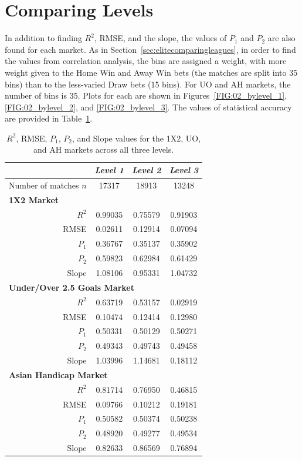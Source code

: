 \documentclass[a4paper,10pt]{report}
\begin{document}
\section{Comparing Levels} \label{sec:enscolevels}
In addition to finding $R^2$, RMSE, and the slope, the values of $P_1$ and $P_2$ are also found for each market. As in Section~\ref{sec:elitecomparingleagues}, in order to find the values from correlation analysis, the bins are assigned a weight, with more weight given to the Home Win and Away Win bets (the matches are split into 35 bins) than to the less-varied Draw bets (15 bins). For UO and AH markets, the number of bins is 35. Plots for each are shown in Figures~\ref{FIG:02_bylevel_1}, \ref{FIG:02_bylevel_2}, and \ref{FIG:02_bylevel_3}. The values of statistical accuracy are provided in Table~\ref{tab:ensco_valuesbylevel}. 

\begin{table}[h!]\begin{center}\begin{tabular}{r||ccc}
		& \textit{Level 1} 	& \textit{Level 2} 	&\textit{Level 3} \\ \hline \hline
Number of matches $n$ 	& 17317	& 18913	& 13248 \\ \hline
\multicolumn{4}{l}{\textbf{1X2 Market}} \\ \hline
$R^2$ 					& 0.99035	& 0.75579	& 0.91903 \\
RMSE					& 0.02611 	& 0.12914 	& 0.07094 \\ 
$P_1$					& 0.36767 	& 0.35137 	& 0.35902 \\ 
$P_2$					& 0.59823 	& 0.62984 	& 0.61429 \\ 
Slope					& 1.08106	& 0.95331	& 1.04732 \\ \hline
\multicolumn{4}{l}{\textbf{Under/Over 2.5 Goals Market}} \\ \hline
$R^2$					& 0.63719	& 0.53157 	& 0.02919 \\
RMSE					& 0.10474	& 0.12414 	& 0.12980 \\ 
$P_1$					& 0.50331 	& 0.50129 	& 0.50271 \\
$P_2$					& 0.49343 	& 0.49743 	& 0.49458 \\
Slope					& 1.03996	& 1.14681	& 0.18112 \\ \hline
\multicolumn{4}{l}{\textbf{Asian Handicap Market}} \\ \hline
$R^2$					& 0.81714	& 0.76950	& 0.46815 \\
RMSE					& 0.09766	& 0.10212 	& 0.19181 \\
$P_1$					& 0.50582 	& 0.50374 	& 0.50238 \\
$P_2$		 			& 0.48920 	& 0.49277 	& 0.49534 \\
Slope					& 0.82633	& 0.86569	& 0.76894

\end{tabular}\end{center}\caption{$R^2$, RMSE, $P_1$, $P_2$, and Slope values for the 1X2, UO, and AH markets across all three levels.}\label{tab:ensco_valuesbylevel}
\end{table}
\end{document}
